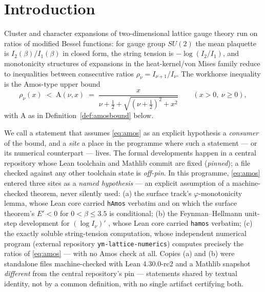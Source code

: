 \documentclass[11pt]{article}
\newcommand{\lean}[1]{\texttt{#1}}
\newcommand{\RHS}{\mathrm{A}}
\begin{document}
\section{Introduction}

Cluster and character expansions of two-dimensional lattice gauge
theory run on ratios of modified Bessel functions: for gauge group
$SU(2)$ the mean plaquette is $I_2(\beta)/I_1(\beta)$ in closed form,
the string tension is $-\log(I_2/I_1)$, and monotonicity structures
of expansions in the heat-kernel/von Mises family reduce to
inequalities between consecutive ratios
$\rho_\nu = I_{\nu+1}/I_\nu$.  The workhorse
inequality is the Amos-type upper bound \cite{Amos74,Segura11,RS16}
\begin{equation}\label{eq:amos}
\rho_\nu(x) \;<\; \RHS(\nu, x) \;=\;
\frac{x}{\nu + \tfrac12 + \sqrt{(\nu+\tfrac12)^2 + x^2}}
\qquad (x > 0,\ \nu \ge 0),
\end{equation}
with $\RHS$ as in Definition~\ref{def:amosbound} below.

We call a statement that assumes \eqref{eq:amos} as an explicit
hypothesis a \emph{consumer} of the bound, and a \emph{site} a place
in the programme where such a statement --- or its numerical
counterpart --- lives.  The formal developments happen in a central
repository whose Lean toolchain and Mathlib commit are fixed
(\emph{pinned}); a file checked against any other toolchain state is
\emph{off-pin}.  In this programme, \eqref{eq:amos} entered three
sites as a \emph{named hypothesis} --- an explicit assumption of a
machine-checked theorem, never silently used:
(a) the surface track's $\varphi$-monotonicity lemma, whose Lean core
carried \lean{hAmos} verbatim and on which the surface theorem's
$E' < 0$ for $0 < \beta \le 3.5$ is conditional;
(b) the Feynman--Hellmann unit-step development for $(\log I_\nu)'$
\cite{ErikssonFH26}, whose Lean core carried \lean{hamos} verbatim;
(c) the exactly soluble string-tension computation, whose
independent numerical program (external repository
\lean{ym-lattice-numerics}) computes precisely the ratios of
\eqref{eq:amos} --- with no Amos check at all.
Copies (a) and (b) were standalone files machine-checked with Lean
4.30.0-rc2 and a Mathlib snapshot \emph{different} from the central
repository's pin --- statements shared by textual identity, not by a
common definition, with no single artifact certifying both.
\end{document}
